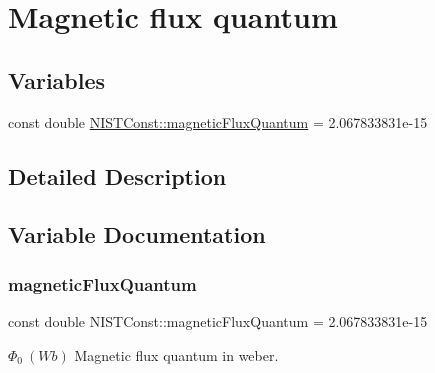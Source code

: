 \hypertarget{group___magnetic_flux_quantum}{}\section{Magnetic flux quantum}
\label{group___magnetic_flux_quantum}
\subsection*{Variables}
\begin{DoxyCompactItemize}
\item 
const double \hyperlink{group___magnetic_flux_quantum_ga2ed9e5fb19a6f2cc0c25ad945ea6b562}{N\+I\+S\+T\+Const\+::magnetic\+Flux\+Quantum} = 2.\+067833831e-\/15
\end{DoxyCompactItemize}


\subsection{Detailed Description}


\subsection{Variable Documentation}
\mbox{\label{group___magnetic_flux_quantum_ga2ed9e5fb19a6f2cc0c25ad945ea6b562}} 
\subsubsection{\texorpdfstring{magnetic\+Flux\+Quantum}{magneticFluxQuantum}}
{\footnotesize\ttfamily const double N\+I\+S\+T\+Const\+::magnetic\+Flux\+Quantum = 2.\+067833831e-\/15}

$\Phi_0 \ (Wb)$ Magnetic flux quantum in weber. 